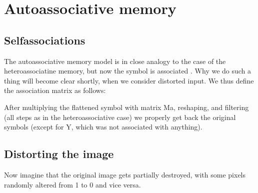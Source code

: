 \documentclass[letterpaper,10pt,english]{jupyterBook}
\begin{document}
\section{Autoassociative memory}
\label{\detokenize{docs/memory:autoassociative-memory}}

\subsection{Self\sphinxhyphen{}associations}
\label{\detokenize{docs/memory:self-associations}}
\sphinxAtStartPar
The autoassociative memory model is in close analogy to the case of the heteroassociatine memory, but now the symbol is associated . Why we do such a thing will become clear shortly, when we consider distorted input. We thus define the association matrix as follows:

\begin{sphinxVerbatim}[commandchars=\\\{\}]
\end{sphinxVerbatim}

\sphinxAtStartPar
After multiplying the flattened symbol with matrix Ma, reshaping, and filtering (all steps as in the heteroassociative case) we properly get back the original symbols (except for Y, which was not associated with anything).

\noindent{}


\subsection{Distorting the image}
\label{\detokenize{docs/memory:distorting-the-image}}
\sphinxAtStartPar
Now imagine that the original image gets partially destroyed, with some pixels randomly altered from 1 to 0 and vice versa.
\end{document}
